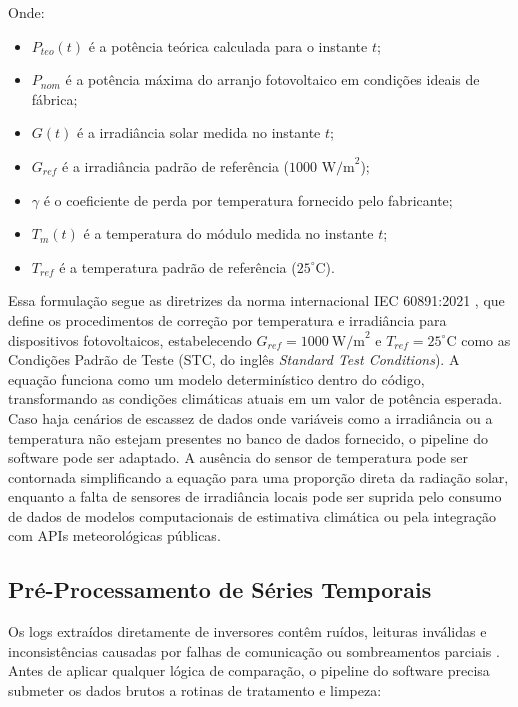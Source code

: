 \documentclass{UNESC}
\begin{document}
Onde:
\begin{itemize}
    \item $P_{teo}(t)$ é a potência teórica calculada para o instante $t$;
    \item $P_{nom}$ é a potência máxima do arranjo fotovoltaico em condições
    ideais de fábrica;
    \item $G(t)$ é a irradiância solar medida no instante $t$;
    \item $G_{ref}$ é a irradiância padrão de referência
    ($1000\text{ W/m}^2$);
    \item $\gamma$ é o coeficiente de perda por temperatura fornecido pelo
    fabricante;
    \item $T_m(t)$ é a temperatura do módulo medida no instante $t$;
    \item $T_{ref}$ é a temperatura padrão de referência ($25^\circ\text{C}$).
\end{itemize}

Essa formulação segue as diretrizes da norma internacional IEC 60891:2021 \cite{iec60891_2021}, que define os procedimentos de
correção por temperatura e irradiância para dispositivos fotovoltaicos,
estabelecendo $G_{ref} = 1000\ \text{W/m}^2$ e $T_{ref} = 25^\circ\text{C}$
como as Condições Padrão de Teste (STC, do inglês
\textit{Standard Test Conditions}). A equação funciona como um modelo
determinístico dentro do código, transformando as condições climáticas
atuais em um valor de potência esperada. Caso haja cenários de escassez
de dados onde variáveis como a irradiância ou a temperatura não estejam
presentes no banco de dados fornecido, o pipeline do software pode ser
adaptado. A ausência do sensor de temperatura pode ser contornada
simplificando a equação para uma proporção direta da radiação solar,
enquanto a falta de sensores de irradiância locais pode ser suprida pelo
consumo de dados de modelos computacionais de estimativa climática ou
pela integração com APIs meteorológicas públicas.

\subsection{Pré-Processamento de Séries Temporais}

Os logs extraídos diretamente de inversores contêm ruídos, leituras
inválidas e inconsistências causadas por falhas de comunicação ou
sombreamentos parciais \cite{livera2021}. Antes de aplicar qualquer
lógica de comparação, o pipeline do software precisa submeter os dados
brutos a rotinas de tratamento e limpeza:
\end{document}
